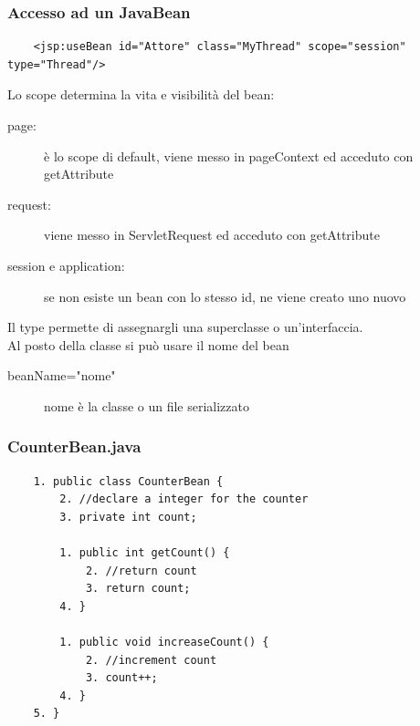 \begin{itemize}
\subsubsection{Accesso ad un JavaBean}
\begin{verbatim}
    <jsp:useBean id="Attore" class="MyThread" scope="session" type="Thread"/>
\end{verbatim}
Lo scope determina la vita e visibilità del bean:
\begin{description}
    \item[page:] è lo scope di default, viene messo in pageContext ed acceduto con getAttribute
    \item[request:] viene messo in ServletRequest ed acceduto con getAttribute
    \item[session e application:] se non esiste un bean con lo stesso id, ne viene creato uno nuovo
\end{description}
Il type permette di assegnargli una superclasse o un'interfaccia.
\\Al posto della classe si può usare il nome del bean
\begin{description}
    \item[beanName="nome"] nome è la classe o un file serializzato
\end{description}

\subsubsection{CounterBean.java}
\begin{verbatim}
    1. public class CounterBean {
        2. //declare a integer for the counter
        3. private int count;

        1. public int getCount() {
            2. //return count
            3. return count;
        4. }

        1. public void increaseCount() {
            2. //increment count
            3. count++;
        4. }
    5. }
\end{verbatim}


\end{itemize}
